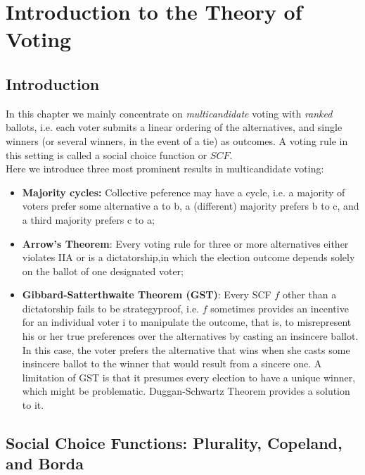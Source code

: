 \chapter{Introduction to the Theory of Voting}

\section{Introduction}

In this chapter we mainly concentrate on \textit{multicandidate} voting with \textit{ranked} ballots, i.e. each voter submits a linear ordering of the alternatives, and single winners (or several winners, in the event of a tie) as outcomes. A voting rule in this setting is called a social choice function or $SCF$.\\

\noindent Here we introduce three most prominent results in multicandidate voting: 
\begin{itemize}
    \item \textbf{Majority cycles:} Collective peference may have a cycle, i.e. a majority of voters prefer some alternative a to b, a (different) majority prefers b to c, and a third majority prefers c to a;
    \item \textbf{Arrow's Theorem}: Every voting rule for three or more alternatives either violates IIA or is a dictatorship,in which the election outcome depends solely on the ballot of one designated voter;
    \item \textbf{Gibbard-Satterthwaite Theorem (GST)}: Every SCF $f$ other than a dictatorship fails to be strategyproof, i.e. $f$ sometimes provides an incentive for an individual voter i to manipulate the outcome, that is, to misrepresent his or her true preferences over the alternatives by casting an insincere ballot.\\
    In this case, the voter prefers the alternative that wins when she casts some insincere ballot to the winner that would result from a sincere one. A limitation of GST is that it presumes every election to have a unique winner, which might be problematic. Duggan-Schwartz Theorem provides a solution to it.
\end{itemize}

\section{Social Choice Functions: Plurality, Copeland, and Borda}


